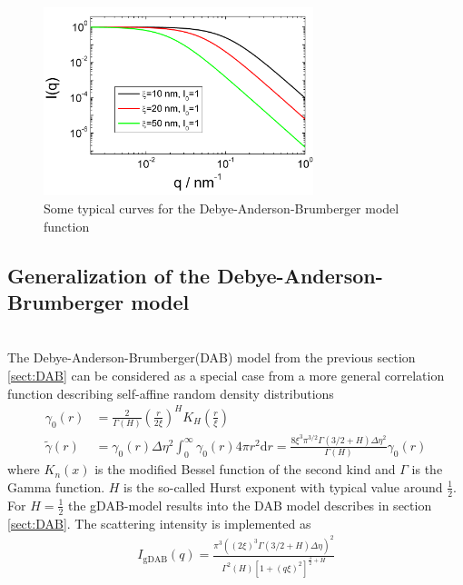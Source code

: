 \begin{figure}[htb]
\begin{center}
\includegraphics[width=0.7\textwidth]{DAB.png}
\end{center}
\caption{Some typical curves for the Debye-Anderson-Brumberger model function} \label{fig:DABIq}
\end{figure}



\clearpage
\subsection{Generalization of the Debye-Anderson-Brumberger model}
\label{sect:gDAB}~\\
The Debye-Anderson-Brumberger(DAB) model from the previous section \ref{sect:DAB} can be considered as a special case from a more general correlation function describing self-affine random density distributions \cite{Klimes2002,Hunter2006,Andersson2008}
\begin{align}
\gamma_0(r) &=
\frac{2}{\Gamma(H)}\left(\frac{r}{2\xi}\right)^H K_H\left(\frac{r}{\xi}\right) \\
\tilde{\gamma}(r) &= \gamma_0(r) \Delta\eta^2 \int_0^\infty \gamma_0(r) 4\pi r^2 \mathrm{d}r = \frac{8\xi^3\pi^{3/2}\Gamma(3/2+H)\Delta\eta^2}{\Gamma(H)}\gamma_0(r)
\end{align}
where $K_n(x)$ is the modified Bessel function of the second kind
and $\Gamma$ is the Gamma function. $H$ is the so-called Hurst
exponent with typical value around $\frac12$. For $H=\frac12$ the gDAB-model results into the DAB model describes in section \ref{sect:DAB}. The scattering intensity is implemented as
\begin{align} \label{eq:gDAB}
I_\mathrm{gDAB}(q) =  \frac{\pi^3\left(\left(2\xi\right)^3\Gamma(3/2+H)\Delta\eta\right)^2}{\Gamma^2(H)\left[1+(q\xi)^2\right]^{\frac32+H}}
\end{align}


